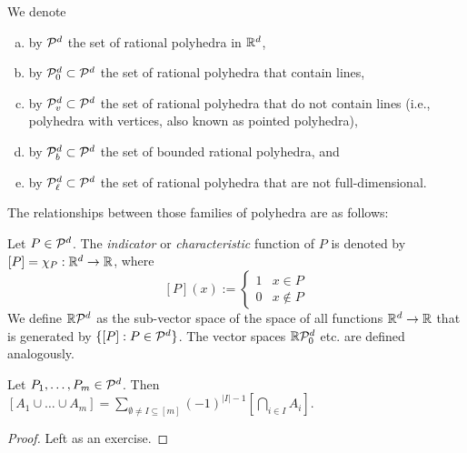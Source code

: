 \begin{definition}
  We denote
  \begin{enumerate}[(a)]
    \item by $\mathcal{P}^d$ the set of rational polyhedra in $\mathbb{R}^d$,
    \item by $\mathcal{P}_0^d \subset \mathcal{P}^d$ the set of rational polyhedra that contain lines,
    \item by $\mathcal{P}_v^d \subset \mathcal{P}^d$ the set of rational polyhedra that do not contain lines
      (i.e., polyhedra with vertices, also known as pointed polyhedra),
    \item by $\mathcal{P}_b^d \subset \mathcal{P}^d$ the set of bounded rational polyhedra, and
    \item by $\mathcal{P}_\ell^d \subset \mathcal{P}^d$ the set of rational polyhedra that are not full-dimensional.
  \end{enumerate}
\end{definition}
The relationships between those families of polyhedra are as follows:
\begin{center}
\end{center}

\begin{definition}
  Let $P \in \mathcal{P}^d$.
  The \emph{indicator} or \emph{characteristic} function of $P$ is denoted by $[P] = \chi_P : \mathbb{R}^d \to \mathbb{R}$,
  where
  \[
    [P](x) := \begin{cases}
                1 & x \in P \\
                0 & x \not\in P
              \end{cases}
  \]
  We define $\mathbb{R} \mathcal{P}^d$ as the sub-vector space of the space of all functions $\mathbb{R}^d \to \mathbb{R}$
  that is generated by $\{ [P] : P \in \mathcal{P}^d \}$.
  The vector spaces $\mathbb{R} \mathcal{P}_0^d$ etc. are defined analogously.
\end{definition}

\begin{lemma}
  \label{lemma:inclusion-exclusion}
  Let $P_1, \ldots, P_m \in \mathcal{P}^d$.
  Then
  $[A_1 \cup \dots \cup A_m] = \sum_{\emptyset \neq I \subseteq [m]} (-1)^{|I| - 1} [\bigcap_{i \in I} A_i]$.
\end{lemma}
\begin{proof}
  Left as an exercise.
\end{proof}


